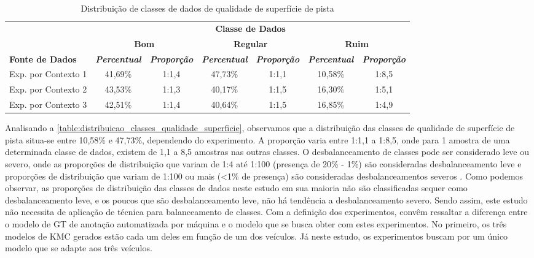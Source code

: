 \begin{table}[h]
\caption{Distribuição de classes de dados de qualidade de superfície de pista}
\label{table:distribuicao_classes_qualidade_superficie}
\centering
\scriptsize
\begin{tabular}{lcccccc}
\cmidrule(l){2-7}
\multicolumn{1}{c}{\multirow{2}{*}{\textbf{}}} & 
\multicolumn{6}{c}{\textbf{Classe de Dados}} \\ \cmidrule(l){2-7} 
\multicolumn{1}{c}{} & 
\multicolumn{2}{c}{\textbf{Bom}} & 
\multicolumn{2}{c}{\textbf{Regular}} & 
\multicolumn{2}{c}{\textbf{Ruim}} \\ \midrule
\textbf{Fonte de Dados} & 
\textit{\textbf{Percentual}} & 
\textit{\textbf{Proporção}} & 
\textit{\textbf{Percentual}} & 
\textit{\textbf{Proporção}} & 
\textit{\textbf{Percentual}} & 
\textit{\textbf{Proporção}} \\ \midrule
Exp. por Contexto 1 & 41,69\% & 1:1,4 & 47,73\% & 1:1,1 & 10,58\% & 1:8,5 \\ \midrule
Exp. por Contexto 2 & 43,53\% & 1:1,3 & 40,17\% & 1:1,5 & 16,30\% & 1:5,1 \\ \midrule
Exp. por Contexto 3 & 42,51\% & 1:1,4 & 40,64\% & 1:1,5 & 16,85\% & 1:4,9 \\ \bottomrule
\end{tabular}
\end{table}

Analisando a \autoref{table:distribuicao_classes_qualidade_superficie}, observamos que a distribuição das classes de qualidade de superfície de pista situa-se entre 10,58\% e 47,73\%, dependendo do experimento. A proporção varia entre 1:1,1 a 1:8,5, onde para 1 amostra de uma determinada classe de dados, existem de 1,1 a 8,5 amostras nas outras classes. O desbalanceamento de classes pode ser considerado leve ou severo, onde as proporções de distribuição que variam de 1:4 até 1:100 (presença de 20\% - 1\%) são consideradas desbalanceamento leve e proporções de distribuição que variam de 1:100 ou mais (<1\% de presença) são consideradas desbalanceamentos severos \cite{Krawczyk2016,Brownlee2020}. Como podemos observar, as proporções de distribuição das classes de dados neste estudo em sua maioria não são classificadas sequer como desbalanceamento leve, e os poucos que são desbalanceamento leve, não há tendência a desbalanceamento severo. Sendo assim, este estudo não necessita de aplicação de técnica para balanceamento de classes. Com a definição dos experimentos, convêm ressaltar a diferença entre o modelo de GT de anotação automatizada por máquina e o modelo que se busca obter com estes experimentos. No primeiro, os três modelos de KMC gerados estão cada um deles em função de um dos veículos. Já neste estudo, os experimentos buscam por um único modelo que se adapte aos três veículos.

